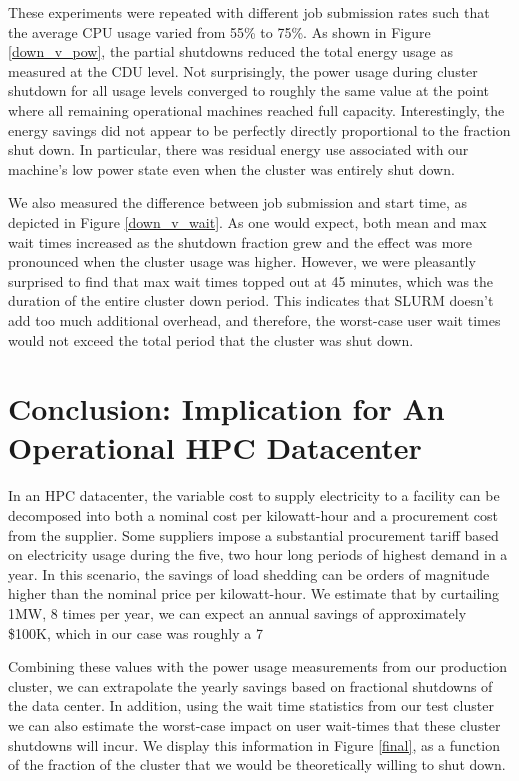 \documentclass[letterpaper,twocolumn,10pt]{article}
\begin{document}
These experiments were repeated with different job submission rates such that the average CPU usage varied from 55\% to 75\%.  As shown in Figure \ref{down_v_pow}, the partial shutdowns reduced the total energy usage as measured at the CDU level.  Not surprisingly, the power usage during cluster shutdown for all usage levels converged to roughly the same value at the point where all remaining operational machines reached full capacity. Interestingly, the energy savings did not appear to be perfectly directly proportional to the fraction shut down.  In particular, there was residual energy use associated with our machine's low power state even when the cluster was entirely shut down.   

We also measured the difference between job submission and start time, as depicted in Figure \ref{down_v_wait}.  As one would expect, both mean and max wait times increased as the shutdown fraction grew and the effect was more pronounced when the cluster usage was higher.  However, we were pleasantly surprised to find that max wait times topped out at 45 minutes, which was the duration of the entire cluster down period.  This indicates that SLURM doesn't add too much additional overhead, and therefore, the worst-case user wait times would not exceed the total period that the cluster was shut down.

\section{Conclusion: Implication for An Operational HPC Datacenter}


In an HPC datacenter, the variable cost to supply electricity to a facility can be decomposed into both a nominal cost per kilowatt-hour and a procurement cost from the supplier.  Some suppliers impose a substantial procurement tariff based on electricity usage during the five, two hour long periods of highest demand in a year.  In this scenario, the savings of load shedding can be orders of magnitude higher than the nominal price per kilowatt-hour.  We estimate that by curtailing 1MW, 8 times per year, we can expect an annual savings of approximately \$100K, which in our case was roughly a 7%



Combining these values with the power usage measurements from our production cluster, we can extrapolate the yearly savings based on fractional shutdowns of the data center.  In addition, using the wait time statistics from our test cluster we can also estimate the worst-case impact on user wait-times that these cluster shutdowns will incur.  We display this information in Figure \ref{final}, as a function of the fraction of the cluster that we would be theoretically willing to shut down.
\end{document}

